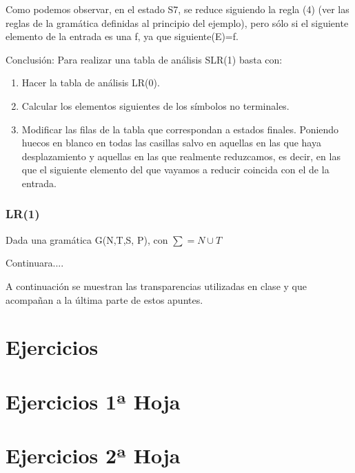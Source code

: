 \documentclass{apuntes}
\begin{document}
\begin{example}
Como podemos observar, en el estado S7, se reduce siguiendo la regla (4) (ver las reglas de la gramática definidas al principio del ejemplo), pero sólo si el siguiente elemento de la entrada es una f, ya que siguiente(E)={f}.

Conclusión: Para realizar una tabla de análisis SLR(1) basta con:
\begin{enumerate}
\item Hacer la tabla de análisis LR(0).
\item Calcular los elementos siguientes de los símbolos no terminales.
\item Modificar las filas de la tabla que correspondan a estados finales. Poniendo huecos en blanco en todas las casillas salvo en aquellas en las que haya desplazamiento y aquellas en las que realmente reduzcamos, es decir, en las que el siguiente elemento del que vayamos a reducir coincida con el de la entrada.
\end{enumerate}




\end{example}


\subsection{LR(1)}
Dada una gramática G(N,T,S, P), con $\sum = N \cup T$ 

Continuara....

A continuación se muestran las transparencias utilizadas en clase y que acompañan a la última parte de estos apuntes.










\appendix
\chapter{Ejercicios}


\chapter{Ejercicios 1ª Hoja}


\chapter{Ejercicios 2ª Hoja}


\printindex
\end{document}
